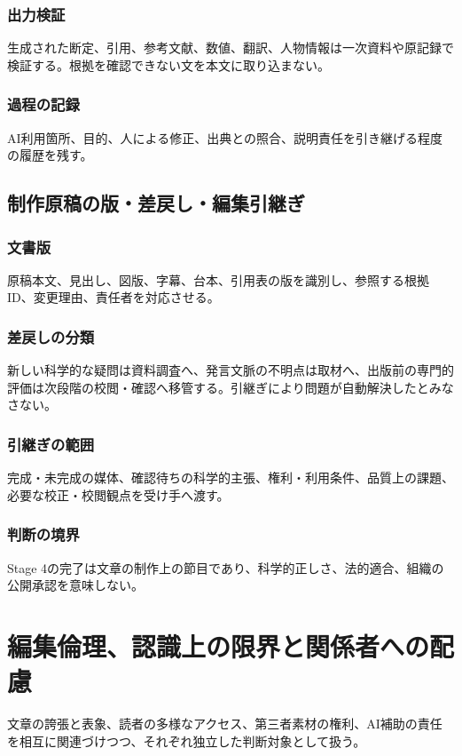 \documentclass[a4paper,11pt]{article}
\begin{document}
\subsubsection{出力検証}
\par 生成された断定、引用、参考文献、数値、翻訳、人物情報は一次資料や原記録で検証する。根拠を確認できない文を本文に取り込まない。\par\medskip
\subsubsection{過程の記録}
\par AI利用箇所、目的、人による修正、出典との照合、説明責任を引き継げる程度の履歴を残す。\par\medskip
\subsection{制作原稿の版・差戻し・編集引継ぎ}
\subsubsection{文書版}
\par 原稿本文、見出し、図版、字幕、台本、引用表の版を識別し、参照する根拠ID、変更理由、責任者を対応させる。\par\medskip
\subsubsection{差戻しの分類}
\par 新しい科学的な疑問は資料調査へ、発言文脈の不明点は取材へ、出版前の専門的評価は次段階の校閲・確認へ移管する。引継ぎにより問題が自動解決したとみなさない。\par\medskip
\subsubsection{引継ぎの範囲}
\par 完成・未完成の媒体、確認待ちの科学的主張、権利・利用条件、品質上の課題、必要な校正・校閲観点を受け手へ渡す。\par\medskip
\subsubsection{判断の境界}
\par Stage 4の完了は文章の制作上の節目であり、科学的正しさ、法的適合、組織の公開承認を意味しない。\par\medskip
\section{編集倫理、認識上の限界と関係者への配慮}
\par 文章の誇張と表象、読者の多様なアクセス、第三者素材の権利、AI補助の責任を相互に関連づけつつ、それぞれ独立した判断対象として扱う。\par\medskip
\end{document}
